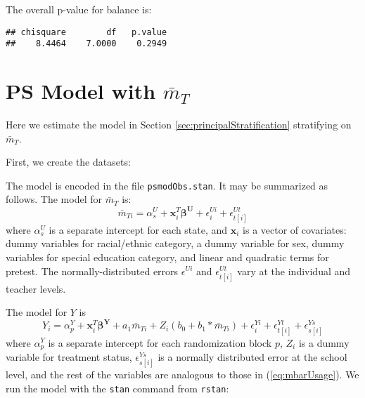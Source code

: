 \documentclass{article}
\begin{document}
The overall p-value for balance is:
\begin{knitrout}
\color{fgcolor}\begin{kframe}
\begin{alltt}
 
 \hlkwb{<-} \hlopt{~}\hlstd{)}\hlopt{+}\hlopt{+}\hlopt{+}\hlopt{+}\hlopt{+}\hlstd{=}\hlstd{)}
\hlopt{$}\hlstd{overall[}\hlstd{,])}
\end{alltt}
\begin{verbatim}
## chisquare        df   p.value 
##    8.4464    7.0000    0.2949
\end{verbatim}
\end{kframe}
\end{knitrout}

\section{PS Model with $\bar{m}_T$}

Here we estimate the model in Section
\ref{sec:principalStratification} stratifying on $\bar{m}_T$.

First, we create the datasets:
\begin{kframe}
\begin{alltt}
\hlstd{(}\hlstd{)}
\end{alltt}
\end{kframe}

The model is encoded in the file \texttt{psmodObs.stan}.
It may be summarized as follows.
The model for $\bar{m}_T$ is:
\begin{equation}\label{eq:mbarUsage}
\bar{m}_{Ti}=\alpha^U_s+\bm{x}_i^T\bm{\beta^U}+\epsilon^{Ui}_i+\epsilon^{Ut}_{t[i]}
\end{equation}
where $\alpha^U_s$ is a separate intercept for each state, and $\bm{x}_i$ is a vector of covariates: dummy variables for
racial/ethnic category, a dummy variable for sex, dummy variables for
special education category, and linear and quadratic terms for
pretest.
The normally-distributed errors $\epsilon^{Ui}$ and $\epsilon^{Ut}_{t[i]}$ vary at the
individual and teacher levels.

The model for $Y$ is
\begin{equation}
Y_i=\alpha^Y_p+\bm{x}_i^T\bm{\beta^Y}+a_1\bar{m}_{Ti}+Z_i(b_0+b_1*\bar{m}_{Ti})+\epsilon^{Yi}_i+\epsilon^{Yt}_{t[i]}+\epsilon^{Ys}_{s[i]}
\end{equation}
where $\alpha^Y_p$ is a separate intercept for each randomization
block $p$, $Z_i$ is a dummy variable for treatment status,
$\epsilon^{Ys}_{s[i]}$ is a normally distributed error at the school
level, and the rest of the variables are analogous to those in
(\ref{eq:mbarUsage}).
We run the model with the \texttt{stan} command from \texttt{rstan}:
\end{document}
